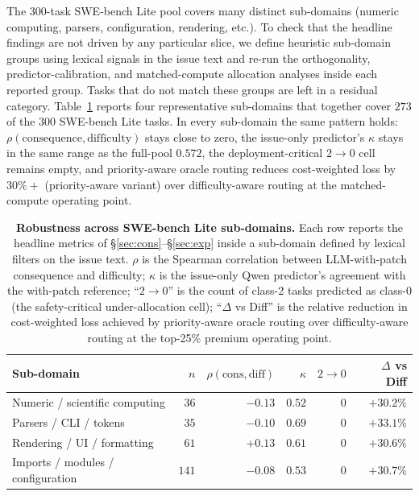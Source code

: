 \documentclass{article}
\begin{document}
The 300-task SWE-bench Lite pool covers many distinct sub-domains
(numeric computing, parsers, configuration, rendering, etc.). To check that the headline findings are not driven by any particular
slice, we define heuristic sub-domain groups using lexical signals in
the issue text and re-run the orthogonality, predictor-calibration,
and matched-compute allocation analyses inside each reported group.
Tasks that do not match these groups are left in a residual category. Table~\ref{tab:subdomain} reports
four representative sub-domains that together cover $273$ of the $300$
SWE-bench Lite tasks. In every sub-domain the same pattern holds:
$\rho(\mathrm{consequence}, \mathrm{difficulty})$ stays close to zero,
the issue-only predictor's $\kappa$ stays in the same range as the
full-pool $0.572$, the deployment-critical $2{\to}0$ cell remains
empty, and priority-aware oracle routing reduces cost-weighted loss by
$30\%+$ (priority-aware variant) over difficulty-aware routing at
the matched-compute operating point.

\begin{table}[h]
\centering
\caption{\textbf{Robustness across SWE-bench Lite sub-domains.} Each
row reports the headline metrics of \S\ref{sec:cons}--\S\ref{sec:exp}
inside a sub-domain defined by lexical filters on the issue text.
$\rho$ is the Spearman correlation between LLM-with-patch consequence
and difficulty; $\kappa$ is the issue-only Qwen predictor's agreement
with the with-patch reference; ``$2{\to}0$'' is the count of class-2
tasks predicted as class-0 (the safety-critical under-allocation cell);
``$\Delta$ vs Diff'' is the relative reduction in cost-weighted loss
achieved by priority-aware oracle routing over difficulty-aware
routing at the top-25\% premium operating point.}
\label{tab:subdomain}
\small
\begin{tabular}{lrrrrr}
\toprule
Sub-domain & $n$ & $\rho(\mathrm{cons}, \mathrm{diff})$ & $\kappa$ & $2{\to}0$ & $\Delta$ vs Diff \\
\midrule
Numeric / scientific computing       & $\phantom{0}36$  & $-0.13$ & $0.52$ & $0$ & $+30.2\%$ \\
Parsers / CLI / tokens               & $\phantom{0}35$  & $-0.10$ & $0.69$ & $0$ & $+33.1\%$ \\
Rendering / UI / formatting          & $\phantom{0}61$  & $+0.13$ & $0.61$ & $0$ & $+30.6\%$ \\
Imports / modules / configuration    & $141$ & $-0.08$ & $0.53$ & $0$ & $+30.7\%$ \\
\bottomrule
\end{tabular}
\end{table}
\end{document}
